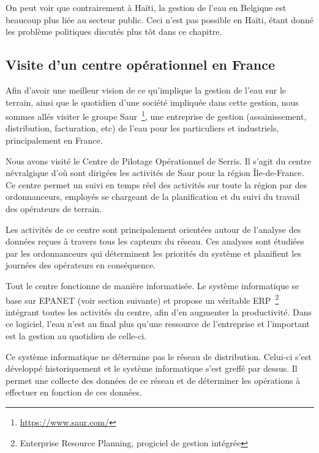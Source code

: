 \documentclass{eplmastersthesis_FR}
\begin{document}

				On peut voir que contrairement à Haïti, la gestion de l'eau en Belgique est beaucoup plus liée au secteur public. Ceci n'est pas possible en Haïti, étant donné les problème politiques discutés plus tôt dans ce chapitre.

			\subsection*{Visite d'un centre opérationnel en France}

				Afin d'avoir une meilleur vision de ce qu'implique la gestion de l'eau sur le terrain, ainsi que le quotidien d'une société impliquée dans cette gestion, nous sommes allés visiter le groupe Saur~\footnote{\url{https://www.saur.com/}}, une entreprise de gestion (assainissement, distribution, facturation, etc) de l'eau pour les particuliers et industriels, principalement en France.

				Nous avons visité le Centre de Pilotage Opérationnel de Serris. Il s'agit du centre névralgique d'où sont dirigées les activités de Saur pour la région Île-de-France. Ce centre permet un suivi en temps réel des activités sur toute la région par des ordonnanceurs, employés se chargeant de la planification et du suivi du travail des opérateurs de terrain.

				Les activités de ce centre sont principalement orientées autour de l'analyse des données reçues à travers tous les capteurs du réseau. Ces analyses sont étudiées par les ordonnanceurs qui déterminent les priorités du système et planifient les journées des opérateurs en conséquence.

				Tout le centre fonctionne de manière informatisée. Le système informatique se base sur EPANET (voir section suivante) et propose un véritable ERP~\footnote{Enterprise Resource Planning, progiciel de gestion intégrée} intégrant toutes les activités du centre, afin d'en augmenter la productivité. Dans ce logiciel, l'eau n'est au final plus qu'une ressource de l'entreprise et l'important est la gestion au quotidien de celle-ci.

				Ce système informatique ne détermine pas le réseau de distribution. Celui-ci s'est développé historiquement et le système informatique s'est greffé par dessus. Il permet une collecte des données de ce réseau et de déterminer les opérations à effectuer en fonction de ces données.
\end{document}
